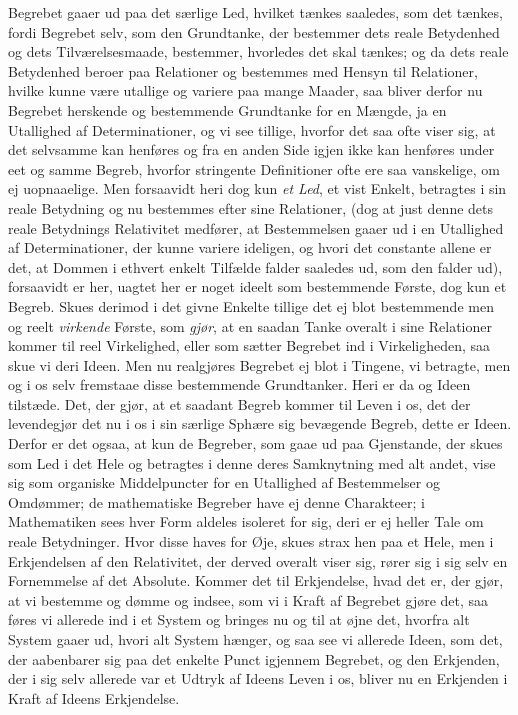 \documentclass[12pt,a4paper]{book}
\newcommand{\apage}[1]{\marginnote{\footnotesize\textit{[#1]}}}
\begin{document}
Begrebet gaaer ud paa det særlige Led, hvilket tænkes saaledes, som det tænkes,
fordi Begrebet selv, som den Grundtanke, der bestemmer dets reale Betydenhed og
dets Tilværelsesmaade, bestemmer, hvorledes det skal tænkes; og da dets reale
Betydenhed beroer paa Relationer og bestemmes med Hensyn til Relationer, hvilke
kunne være utallige og variere paa mange Maader, saa bliver derfor nu Begrebet
herskende og bestemmende Grundtanke for en Mængde, ja en Utallighed af
Determinationer, og vi see tillige, hvorfor det saa ofte viser sig, at det
selvsamme kan henføres og fra en anden Side igjen ikke kan henføres under eet og
samme Begreb, hvorfor stringente Definitioner ofte ere saa vanskelige, om ej
uopnaaelige. Men forsaavidt heri dog kun \emph{et Led}, et vist Enkelt, betragtes
i sin reale Betydning og nu bestemmes efter sine Relationer, (dog at just denne
dets reale Betydnings Relativitet medfører, at Bestemmelsen gaaer ud i en
Utallighed af Determinationer, der kunne variere ideligen, og hvori det constante
allene er det, at Dommen i ethvert enkelt Tilfælde falder saaledes ud, som den
falder ud), forsaavidt er her, uagtet her er noget ideelt som bestemmende Første,
dog kun et Begreb. Skues derimod i det givne Enkelte tillige det ej blot
bestemmende men og reelt \emph{virkende} Første, \apage{127}  som \emph{gjør}, at en saadan Tanke
overalt i sine Relationer kommer til reel Virkelighed, eller som sætter Begrebet
ind i Virkeligheden, saa skue vi deri Ideen. Men nu realgjøres Begrebet ej blot i
Tingene, vi betragte, men og i os selv fremstaae disse bestemmende Grundtanker.
Heri er da og Ideen tilstæde. Det, der gjør, at et saadant Begreb kommer til
Leven i os, det der levendegjør det nu i os i sin særlige Sphære sig bevægende
Begreb, dette er Ideen. Derfor er det ogsaa, at kun de Begreber, som gaae ud paa
Gjenstande, der skues som Led i det Hele og betragtes i denne deres Samknytning
med alt andet, vise sig som organiske Middelpuncter for en Utallighed af
Bestemmelser og Omdømmer; de mathematiske Begreber have ej denne Charakteer; i
Mathematiken sees hver Form aldeles isoleret for sig, deri er ej heller Tale om
reale Betydninger. Hvor disse haves for Øje, skues strax hen paa et Hele, men i
Erkjendelsen af den Relativitet, der derved overalt viser sig, rører sig i sig
selv en Fornemmelse af det Absolute. Kommer det til Erkjendelse, hvad det er, der
gjør, at vi bestemme og dømme og indsee, som vi i Kraft af Begrebet gjøre det, saa
føres vi allerede ind i et System og bringes nu og til at øjne det, hvorfra alt
System gaaer ud, hvori alt System hænger, og saa see vi allerede Ideen, som det,
der aabenbarer sig paa det enkelte Punct igjennem \apage{128} Begrebet, og den Erkjenden, der
i sig selv allerede var et Udtryk af Ideens Leven i os, bliver nu en Erkjenden i
Kraft af Ideens Erkjendelse.
\end{document}
